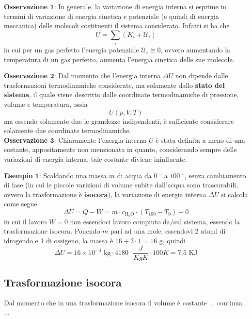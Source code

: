 \documentclass[a4paper]{extarticle}
\begin{document}
\vspace{1em}
\noindent
\textbf{Osservazione $\boldsymbol{1}$}: In generale, la variazione di energia interna si esprime in termini di variazione di energia cinetica e potenziale (e quindi di energia meccanica) delle molecoli costituenti il sistema considerato. Infatti si ha che
\[\boxed{U=\sum_i (K_i + \mathcal{U}_i)}\]
in cui per un gas perfetto l'energia potenziale $\mathcal{U}_i \cong 0$, ovvero aumentando la temperatura di un gas perfetto, aumenta l'energia cinetica delle sue molecole.

\vspace{1em}
\noindent
\textbf{Osservazione $\boldsymbol{2}$}: Dal momento che l'energia interna $\Delta U$ non dipende dalle trasformazioni termodinamiche considerate, ma solamente dallo \textbf{stato del sistema}, il quale viene descritto dalle coordinate termodinamiche di pressione, volume e temperatura, ossia
\[U(p,V,T)\]
ma essendo solamente due le grandezze indipendenti, è sufficiente considerare solamente due coordinate termodinamiche.\\

\vspace{1em}
\noindent
\textbf{Osservazione $\boldsymbol{3}$}: Chiaramente l'energia interna $U$ è stata definita a meno di una costante, appositamente non menzionata in quanto, considerando sempre delle variazioni di energia interna, tale costante diviene ininfluente.

\vspace{1em}
\noindent
\textbf{Esempio $\boldsymbol{1}$}: Scaldando una massa $m$ di acqua da $0$ $^\circ$ a $100$ $^\circ$, senza cambiamento di fase (in cui le piccole varizioni di volume subite dall'acqua sono trascurabili, ovvero la trasformazione è \textbf{isocora}), la variazione di energia interna $\Delta U$ si calcola come segue
\[\Delta U = Q - W = m \cdot c_{\text{H}_2\text{O}} \cdot (T_{100} - T_0) - 0\]
in cui il lavoro $W=0$ non essendoci lavoro compiuto da/sul sistema, essendo la trasformazione isocora. Ponendo $m$ pari ad una mole, essendovi 2 atomi di idrogendo e 1 di ossigeno, la massa è $16 + 2 \cdot 1 = 16$ g, quindi
\[\Delta U = 16 \times 10^{-3} \text{ kg} \cdot 4180 \text{ } \frac{J}{Kg K} \cdot 100 K = 7.5 \text{ KJ}\]

\vspace{1em}
\subsection{Trasformazione isocora}
Dal momento che in una trasformazione isocora il volume è costante ... continua ...
\end{document}
